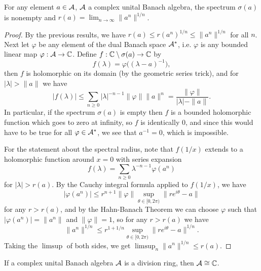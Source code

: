 \begin{thm} For any element $a \in \mathcal{A}$, $\mathcal{A}$ a complex unital Banach algebra, the spectrum $\sigma(a)$ is nonempty and $r(a) = \lim_{n \rightarrow \infty} \|a^n\|^{1/n}$.
\end{thm}
\begin{proof} By the previous results, we have $r(a) \le r(a^n)^{1/n} \le \|a^n\|^{1/n}$ for all $n$. Next let $\varphi$ be any element of the dual Banach space $\mathcal{A}^*$, i.e. $\varphi$ is any bounded linear map $\varphi : \mathcal{A} \rightarrow \mathbb{C}$. Define $f : \mathbb{C}\setminus \sigma(a) \rightarrow \mathbb{C}$ by
\[
f(\lambda) = \varphi\big((\lambda - a)^{-1}\big),
\]
then $f$ is holomorphic on its domain (by the geometric series trick), and for $|\lambda| > \|a\|$ we have
\[
|f(\lambda)| \le \sum_{n \ge 0} |\lambda|^{-n-1} \|\varphi\| \|a\|^n = \frac{\|\varphi\|}{|\lambda| - \|a\|}.
\]
In particular, if the spectrum $\sigma(a)$ is empty then $f$ is a bounded holomorphic function which goes to zero at infinity, so $f$ is identically $0$, and since this would have to be true for all $\varphi \in \mathcal{A}^*$, we see that $a^{-1} = 0$, which is impossible.

For the statement about the spectral radius, note that $f(1/x)$ extends to a holomorphic function around $x = 0$ with series expansion
\[
f(\lambda) = \sum_{n \ge 0} \lambda^{-n-1}\varphi(a^n)
\]
for $|\lambda| > r(a)$. By the Cauchy integral formula applied to $f(1/x)$, we have
\[
|\varphi(a^n)| \le r^{n+1} \|\varphi\| \sup_{\theta \in [0,2\pi)} \|r e^{i\theta} - a\|
\]
for any $r > r(a)$, and by the Hahn-Banach Theorem we can choose $\varphi$ such that $|\varphi(a^n)| = \|a^n\|$ and $\|\varphi\| = 1$, so for any $r > r(a)$ we have
\[
\|a^n\|^{1/n} \le r^{1 + 1/n} \sup_{\theta \in [0,2\pi)} \|r e^{i\theta} - a\|^{1/n}.
\]
Taking the $\limsup$ of both sides, we get $\limsup_n \|a^n\|^{1/n} \le r(a)$.
\end{proof}

\begin{cor} If a complex unital Banach algebra $\mathcal{A}$ is a division ring, then $\mathcal{A} \cong \mathbb{C}$.
\end{cor}

